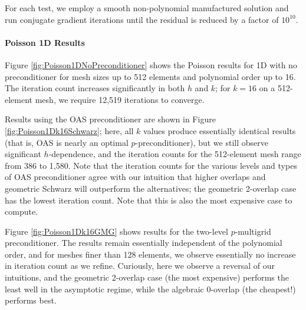 For each test, we employ a smooth non-polynomial manufactured solution and run conjugate gradient iterations until the residual is reduced by a factor of $10^{10}$.

\paragraph{Poisson 1D Results}
Figure \ref{fig:Poisson1DNoPreconditioner} shows the Poisson results for 1D with no preconditioner for mesh sizes up to 512 elements and polynomial order up to 16.  The iteration count increases significantly in both $h$ and $k$; for $k=16$ on a 512-element mesh, we require 12,519 iterations to converge.

Results using the OAS preconditioner are shown in Figure \ref{fig:Poisson1Dk16Schwarz}; here, all $k$ values produce essentially identical results (that is, OAS is nearly an optimal $p$-preconditioner), but we still observe significant $h$-dependence, and the iteration counts for the 512-element mesh range from 386 to 1,580.  Note that the iteration counts for the various levels and types of OAS preconditioner agree with our intuition that higher overlaps and geometric Schwarz will outperform the alternatives; the geometric 2-overlap case has the lowest iteration count.  Note that this is also the most expensive case to compute.

Figure \ref{fig:Poisson1Dk16GMG} shows results for the two-level $p$-multigrid preconditioner.  The results remain essentially independent of the polynomial order, and for meshes finer than 128 elements, we observe essentially no increase in iteration count as we refine.  Curiously, here we observe a reversal of our intuitions, and the geometric 2-overlap case (the most expensive) performs the least well in the asymptotic regime, while the algebraic 0-overlap (the cheapest!) performs best.

